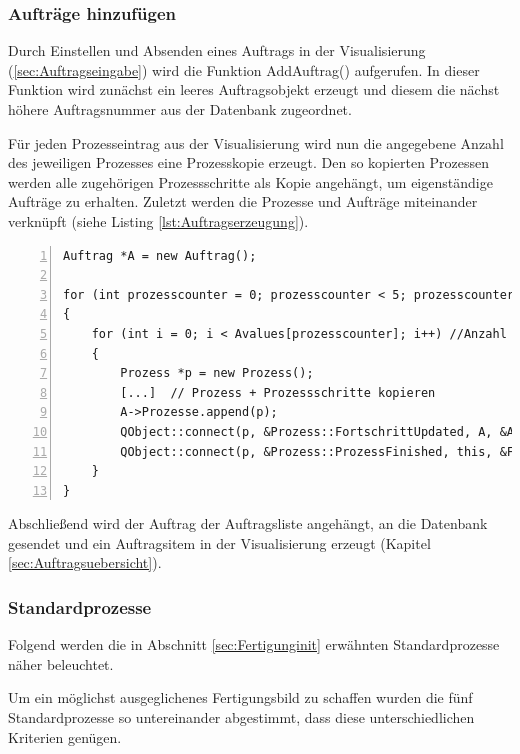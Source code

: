 \subsubsection{Aufträge hinzufügen}

Durch Einstellen und Absenden eines Auftrags in der Visualisierung (\ref{sec:Auftragseingabe}) wird die Funktion AddAuftrag() aufgerufen. In dieser Funktion wird zunächst ein leeres Auftragsobjekt erzeugt und diesem die nächst höhere Auftragsnummer aus der Datenbank zugeordnet.  

Für jeden Prozesseintrag aus der Visualisierung wird nun die angegebene Anzahl des jeweiligen Prozesses eine Prozesskopie erzeugt. Den so kopierten Prozessen werden alle zugehörigen Prozessschritte als Kopie angehängt, um eigenständige Aufträge zu erhalten. Zuletzt werden die Prozesse und Aufträge miteinander verknüpft (siehe Listing \ref{lst:Auftragserzeugung}).

\begin{lstlisting}[frame=single, breaklines=true, numbers=left, stepnumber=2, firstnumber=1, numberstyle = \tiny, caption=Auftragserzeugung und Verknüpfungen,label=lst:Auftragserzeugung]
Auftrag *A = new Auftrag();

for (int prozesscounter = 0; prozesscounter < 5; prozesscounter++) //5 Prozess UI Elemente
{
    for (int i = 0; i < Avalues[prozesscounter]; i++) //Anzahl der eingegebenen Prozesszahl
    {
        Prozess *p = new Prozess();
        [...]  // Prozess + Prozessschritte kopieren
        A->Prozesse.append(p);
        QObject::connect(p, &Prozess::FortschrittUpdated, A, &Auftrag::UpdateFortschritt);
        QObject::connect(p, &Prozess::ProzessFinished, this, &Fertigungsplanung::StationReady);
    }
}
\end{lstlisting}

Abschließend wird der Auftrag der Auftragsliste angehängt, an die Datenbank gesendet und ein Auftragsitem in der Visualisierung erzeugt (Kapitel \ref{sec:Auftragsuebersicht}). 

\subsubsection{Standardprozesse}
\label{sec:Standardprozesse}

Folgend werden die in Abschnitt \ref{sec:Fertigunginit} erwähnten Standardprozesse näher beleuchtet. 

Um ein möglichst ausgeglichenes Fertigungsbild zu schaffen wurden die fünf Standardprozesse so untereinander abgestimmt, dass diese unterschiedlichen Kriterien genügen. 


